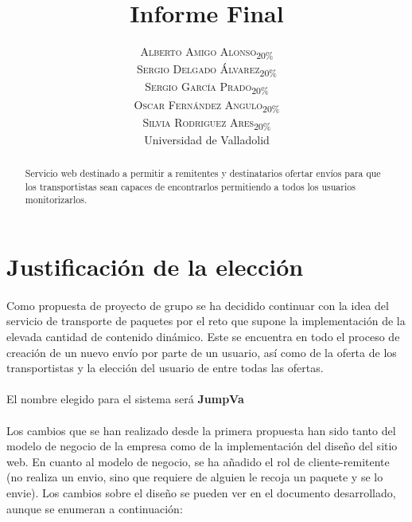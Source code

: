 \documentclass[10pt, a4paper,spanish]{article}
\title{\vspace{-15mm}\fontsize{24pt}{10pt}\selectfont\textbf{Informe Final}} %
\author{
\large
\textsc{Alberto Amigo Alonso\textsubscript{20\%}}\\[2mm] %
\textsc{Sergio Delgado Álvarez\textsubscript{20\%}}\\[2mm] %
\textsc{Sergio García Prado\textsubscript{20\%}}\\[2mm] %
\textsc{Oscar Fernández Angulo\textsubscript{20\%}}\\[2mm] %
\textsc{Silvia Rodriguez Ares\textsubscript{20\%}}\\[2mm] %
\normalsize Universidad de Valladolid \\ %
\vspace{-5mm}
}
\date{}
\begin{document}
	\maketitle %

	\thispagestyle{fancy} %


	\begin{abstract}
		\noindent Servicio web destinado a permitir a remitentes y destinatarios ofertar envíos para que los transportistas sean capaces de encontrarlos permitiendo a todos los usuarios monitorizarlos.
	\end{abstract}


	\section{Justificación de la elección}

		\paragraph{}
		Como propuesta de proyecto de grupo se ha decidido continuar con la idea del servicio de transporte de paquetes por el reto que supone la implementación de la elevada cantidad de contenido dinámico. Este se encuentra en todo el proceso de creación de un nuevo envío por parte de un usuario, así como de la oferta de los transportistas y la elección del usuario de entre todas las ofertas.

		\paragraph{}
		El nombre elegido para el sistema será \textbf{JumpVa}

		\paragraph{}
		Los cambios que se han realizado desde la primera propuesta han sido tanto del modelo de negocio de la empresa como de la implementación del diseño del sitio web. En cuanto al modelo de negocio, se ha añadido el rol de cliente-remitente (no realiza un envio, sino que requiere de alguien le recoja un paquete y se lo envie). Los cambios sobre el diseño se pueden ver en el documento desarrollado, aunque se enumeran a continuación:
\end{document}

